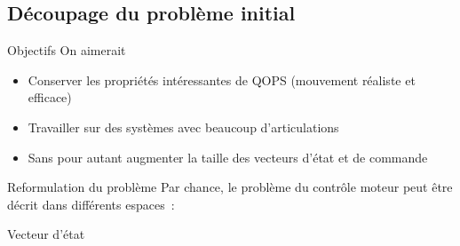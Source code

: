 \subsection{Découpage du problème initial}

\begin{frame}{Objectifs}
    On aimerait
    \begin{itemize}
        \item Conserver les propriétés intéressantes de QOPS (mouvement réaliste et efficace)
        \item Travailler sur des systèmes avec beaucoup d'articulations
        \item Sans pour autant augmenter la taille des vecteurs d'état et de commande
    \end{itemize}
\end{frame}

\begin{frame}{Reformulation du problème}
    Par chance, le problème du contrôle moteur peut être décrit dans différents espaces~:
    \begin{block}{Vecteur d'état}
        \begin{figure}
            \centering
            ~~
        \end{figure}
    \end{block}
\end{frame}

